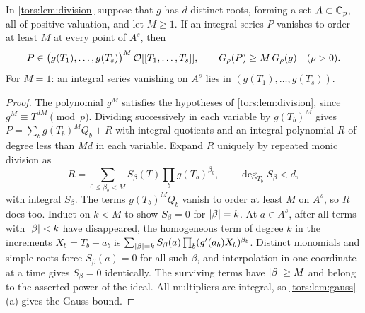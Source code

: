 \begin{lemma}\label{tors:lem:grid}
In \cref{tors:lem:division} suppose that $g$ has $d$ distinct roots, forming a set
$A\subset\mathbb{C}_p$, all of positive valuation, and let $M\ge1$. If an integral series $P$
vanishes to order at least $M$ at every point of $A^s$, then
\[
  P\in\bigl(g(T_1),\dots,g(T_s)\bigr)^M\,\mathcal{O}[[T_1,\dots,T_s]],\qquad
  G_\rho(P)\ge M\,G_\rho(g)\quad(\rho>0).
\]
For $M=1$: an integral series vanishing on $A^s$ lies in $(g(T_1),\dots,g(T_s))$.
\end{lemma}

\begin{proof}
The polynomial $g^M$ satisfies the hypotheses of \cref{tors:lem:division}, since
$g^M\equiv T^{dM}\pmod p$. Dividing successively in each variable by $g(T_b)^M$ gives
$P=\sum_bg(T_b)^MQ_b+R$ with integral quotients and an integral polynomial $R$ of degree
less than $Md$ in each variable. Expand $R$ uniquely by repeated monic division as
\[
  R=\sum_{0\le\beta_b<M}S_\beta(T)\prod_bg(T_b)^{\beta_b},\qquad \deg_{T_b}S_\beta<d ,
\]
with integral $S_\beta$. The terms $g(T_b)^MQ_b$ vanish to order at least $M$ on $A^s$, so
$R$ does too. Induct on $k<M$ to show $S_\beta=0$ for $\lvert\beta\rvert=k$. At $a\in A^s$, after all
terms with $\lvert\beta\rvert<k$ have disappeared, the homogeneous term of degree $k$ in the
increments $X_b=T_b-a_b$ is $\sum_{\lvert\beta\rvert=k}S_\beta(a)\prod_b(g'(a_b)X_b)^{\beta_b}$.
Distinct monomials and simple roots force $S_\beta(a)=0$ for all such $\beta$, and
interpolation in one coordinate at a time gives $S_\beta=0$ identically. The surviving
terms have $\lvert\beta\rvert\ge M$ and belong to the asserted power of the ideal. All multipliers
are integral, so \cref{tors:lem:gauss}(a) gives the Gauss bound.
\end{proof}

